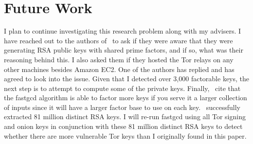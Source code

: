 \section{Future Work}
\label{sec:future}

I plan to continue investigating this research problem along with my advisers. I have reached out to the authors of~\cite{biryukov2013trawling} to ask if they were aware that they were generating RSA public keys with shared prime factors, and if so, what was their reasoning behind this. I also asked them if they hosted the Tor relays on any other machines besides Amazon EC2. One of the authors has replied and has agreed to look into the issue. Given that I detected over 3,000 factorable keys, the next step is to attempt to compute some of the private keys. Finally,~\cite{heninger2012mining} cite that the fastgcd algorithm is able to factor more keys if you serve it a larger collection of inputs since it will have a larger factor base to use on each key.~\cite{hastings2016weak} successfully extracted 81 million distinct RSA keys. I will re-run fastgcd using all Tor signing and onion keys in conjunction with these 81 million distinct RSA keys to detect whether there are more vulnerable Tor keys than I originally found in this paper.